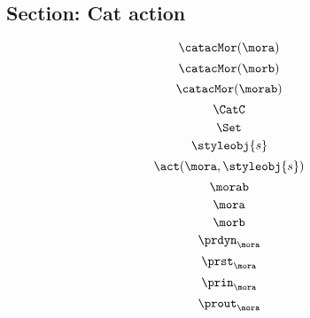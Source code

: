 {\begin{forslides}
    \subsection{Section: Cat action}

    \begin{equation}
        \label{eq:cat-mora}
        \catacMor(\mora)
    \end{equation}
    \begin{equation}
        \label{eq:cat-morb}
        \catacMor(\morb)
    \end{equation}
    \begin{equation}
        \label{eq:cat-morab}
        \catacMor(\morab)
    \end{equation}
    \begin{equation}
        \label{eq:catC}
        \CatC
    \end{equation}
    \begin{equation}
        \label{eq:sets}
        \Set
    \end{equation}
    \begin{equation}
        \label{eq:signal}
        \styleobj{s}
    \end{equation}
    \begin{equation}
        \label{eq:signal-apply}
        \act(\mora, \styleobj{s})
    \end{equation}
    \begin{equation}
        \label{eq:morab}
        \morab
    \end{equation}
    \begin{equation}
        \label{eq:mora}
        \mora
    \end{equation}
    \begin{equation}
        \label{eq:morb}
        \morb
    \end{equation}
    \begin{equation}
        \label{eq:mora-prdyn}
        \prdyn_{\mora}
    \end{equation}
    \begin{equation}
        \label{eq:mora-prst}
        \prst_{\mora}
    \end{equation}
    \begin{equation}
        \label{eq:mora-prin}
        \prin_{\mora}
    \end{equation}
    \begin{equation}
        \label{eq:mora-prout}
        \prout_{\mora}
    \end{equation}

\end{forslides}}
